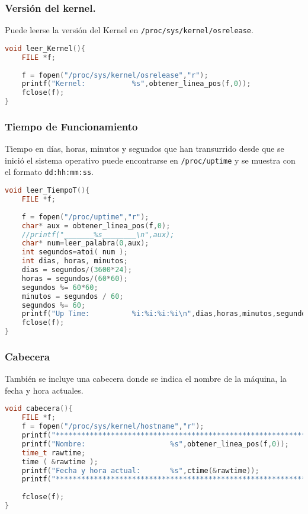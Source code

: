 \documentclass{article}
\begin{document}
\subsubsection*{Versión del kernel.}
Puede leerse la versión del Kernel en \verb+/proc/sys/kernel/osrelease+.
{\fontfamily{\ttdefault}\selectfont
\begin{lstlisting}[language=c,caption=Función leer\_kernel()., breaklines=true] 
void leer_Kernel(){
	FILE *f;
	
	f = fopen("/proc/sys/kernel/osrelease","r");
	printf("Kernel:           %s",obtener_linea_pos(f,0));	
	fclose(f);
}
\end{lstlisting}}

\subsubsection*{Tiempo de Funcionamiento}
Tiempo en días, horas, minutos y segundos que han transurrido desde que se inició el sistema operativo puede encontrarse en \verb+/proc/uptime+ y se muestra con el formato \verb+dd:hh:mm:ss+.
{\fontfamily{\ttdefault}\selectfont
\begin{lstlisting}[language=c,caption=Función leer\_TiempoT()., breaklines=true] 
void leer_TiempoT(){
	FILE *f;
	
	f = fopen("/proc/uptime","r");
	char* aux = obtener_linea_pos(f,0);
	//printf("_______%s________\n",aux);
	char* num=leer_palabra(0,aux);
	int segundos=atoi( num );
	int dias, horas, minutos;
    dias = segundos/(3600*24);
    horas = segundos/(60*60);
    segundos %= 60*60;
    minutos = segundos / 60;
    segundos %= 60;
	printf("Up Time:          %i:%i:%i:%i\n",dias,horas,minutos,segundos);
	fclose(f);	
}
\end{lstlisting}}
\subsubsection*{Cabecera}
También se incluye una cabecera donde se indica el nombre de la máquina, la fecha y hora actuales.
{\fontfamily{\ttdefault}\selectfont
\begin{lstlisting}[language=c,caption=Función cabecera()., breaklines=true] 
void cabecera(){
	FILE *f;
	f = fopen("/proc/sys/kernel/hostname","r");
	printf("************************************************************\n");
	printf("Nombre:                    %s",obtener_linea_pos(f,0));
	time_t rawtime;
	time ( &rawtime );
	printf("Fecha y hora actual:       %s",ctime(&rawtime));
	printf("************************************************************\n\n");
	
	fclose(f);
}
\end{lstlisting}}
\end{document}
